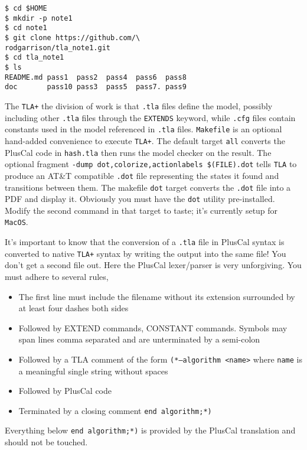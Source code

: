 \documentclass[twocolumn]{article}
\begin{document}
\begin{verbatim}
$ cd $HOME
$ mkdir -p note1
$ cd note1
$ git clone https://github.com/\
rodgarrison/tla_note1.git
$ cd tla_note1
$ ls
README.md pass1  pass2  pass4  pass6  pass8
doc       pass10 pass3  pass5  pass7. pass9
\end{verbatim}

The \texttt{TLA+} the division of work is that \texttt{.tla} files define the model, possibly including other \texttt{.tla} files through the \texttt{EXTENDS} keyword, while \texttt{.cfg} files contain constants used in the model referenced in \texttt{.tla} files. \texttt{Makefile} is an optional hand-added convenience to execute \texttt{TLA+}. The default target \texttt{all} converts the PlusCal code in \texttt{hash.tla} then runs the model checker on the result. The optional fragment \texttt{-dump dot,colorize,actionlabels \$(FILE).dot} tells \texttt{TLA} to produce an AT\&T compatible \texttt{.dot} file representing the states it found and transitions between them. The makefile \texttt{dot} target converts the \texttt{.dot} file into a PDF and display it. Obviously you must have the \texttt{dot} utility pre-installed. Modify the second command in that target to taste; it's currently setup for \texttt{MacOS}.

It's important to know that the conversion of a \texttt{.tla} file in PlusCal syntax is converted to native \texttt{TLA+} syntax by writing the output into the same file! You don't get a second file out. Here the PlusCal lexer/parser is very unforgiving. You must adhere to several rules,

\begin{itemize}
\item The first line must include the filename without its extension surrounded by at least four dashes both sides
\item Followed by EXTEND commands, CONSTANT commands. Symbols may span lines comma separated and are unterminated by a semi-colon
\item Followed by a TLA comment of the form \texttt{(*--algorithm <name>} where \texttt{name} is a meaningful single string without spaces
\item Followed by PlusCal code
\item Terminated by a closing comment \texttt{end algorithm;*)}
\end{itemize}

\noindent Everything below \texttt{end algorithm;*)} is provided by the PlusCal translation and should not be touched.
\end{document}
